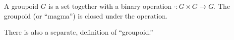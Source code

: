 \documentclass{article}
\begin{document}
A groupoid $G$ is a set together with a binary operation $\cdot : G \times G \longrightarrow G$.  The groupoid (or ``magma'') is closed under the operation.

There is also a separate,  definition of ``groupoid.''
\end{document}
